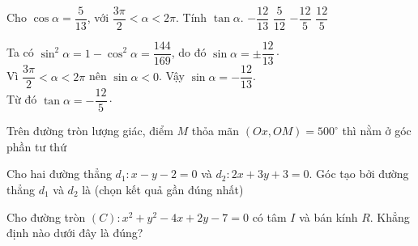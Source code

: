 \begin{ex}%
Cho $ \cos \alpha = \dfrac{5}{13} $,	với $ \dfrac{3\pi}{2} < \alpha < 2 \pi  $. Tính $ \tan \alpha $.
	\choice
	{$ -\dfrac{12}{13} $}
	{$ \dfrac{5}{12} $}
	{\True $ -\dfrac{12}{5} $}
	{$ \dfrac{12}{5} $}
	\loigiai
	{Ta có $ \sin^2 \alpha = 1 - \cos^2 \alpha  = \dfrac{144}{169}$, do đó $ \sin \alpha = \pm \dfrac{12}{13} \cdot $\\
		Vì $ \dfrac{3\pi}{2} < \alpha < 2 \pi  $ nên $ \sin \alpha < 0 $. Vậy $ \sin \alpha = -\dfrac{12}{13} $.\\
		Từ đó $ \tan \alpha = - \dfrac{12}{5} \cdot$
		
	}
\end{ex}

\begin{ex}%
Trên đường tròn lượng giác, điểm $M$ thỏa mãn $(Ox,OM)=500^\circ$  thì nằm ở góc phần tư thứ
\end{ex}

\begin{ex}%
Cho hai đường thẳng $d_1:x-y-2=0$ và $d_2:2x+3y+3=0$. Góc tạo bởi đường thẳng $d_1$ và $d_2$ là (chọn kết quả gần đúng nhất)
\end{ex}

\begin{ex}%
Cho đường tròn $(C): x^2+y^2-4x+2y-7=0$ có tâm $I$ và bán kính $R$. Khẳng định nào dưới đây là đúng?

\end{ex}

